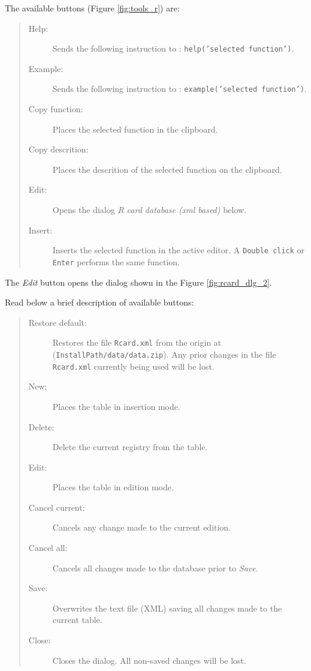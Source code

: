 The available buttons
(Figure \ref{fig:tools_r})
are:

\begin{quote}
  \begin{footnotesize}
    \begin{description}
      \item[Help:]
        Sends the following instruction to \RR{}: \texttt{help('selected function')}.
      \item[Example:]
        Sends the following instruction to \RR{}: \texttt{example('selected function')}.
      \item[Copy function:]
        Places the selected function in the clipboard.
      \item[Copy descrition:]
        Places the descrition of the selected function on the clipboard.
      \item[Edit:]
        Opens the dialog \textit{R card database (xml based)} below.
      \item[Insert:]
        Inserts the selected function in the active editor. A
        \texttt{Double click} or \texttt{Enter} performs the same function.
    \end{description}
  \end{footnotesize}
\end{quote}

The \textit{Edit} button opens the dialog shown in the Figure \ref{fig:rcard_dlg_2}.

Read below a brief description of available buttons:

\begin{quote}
  \begin{footnotesize}
    \begin{description}
      \item[Restore default:]
        Restores the file \texttt{Rcard.xml} from the origin at
        (\texttt{InstallPath/data/data.zip}). Any prior changes in the
        file \texttt{Rcard.xml} currently being used will be lost.
      \item[New:]
        Places the table in insertion mode.
      \item[Delete:]
        Delete the current registry from the table.
      \item[Edit:]
        Places the table in edition mode.
      \item[Cancel current:]
        Cancels any change made to the current edition.
      \item[Cancel all:]
        Cancels all changes made to the database prior to \textit{Save}.
      \item[Save:]
        Overwrites the text file (XML) saving all changes made to the current table.
      \item[Close:]
        Closes the dialog. All non-saved changes will be lost.
    \end{description}
  \end{footnotesize}
\end{quote}


